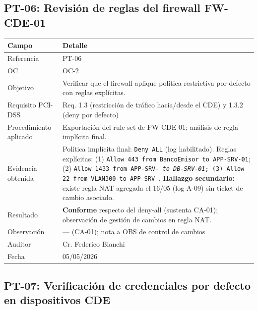 \documentclass[11pt,a4paper]{article}
\begin{document}
\subsection{PT-06: Revisión de reglas del firewall FW-CDE-01}

\begin{tabularx}{\textwidth}{P{5cm}L}
\toprule
\textbf{Campo} & \textbf{Detalle} \\
\midrule
Referencia & PT-06 \\
OC & OC-2 \\
Objetivo & Verificar que el firewall aplique política restrictiva por defecto con reglas explícitas. \\
Requisito PCI-DSS & Req. 1.3 (restricción de tráfico hacia/desde el CDE) y 1.3.2 (deny por defecto) \\
Procedimiento aplicado & Exportación del rule-set de FW-CDE-01; análisis de regla implícita final. \\
Evidencia obtenida & Política implícita final: \texttt{Deny ALL} (log habilitado). Reglas explícitas: (1) \texttt{Allow 443 from BancoEmisor to APP-SRV-01}; (2) \texttt{Allow 1433 from APP-SRV-\textit{ to DB-SRV-01}; (3) \texttt{Allow 22 from VLAN300 to APP-SRV-}}. \textbf{Hallazgo secundario:} existe regla NAT agregada el 16/05 (log A-09) sin ticket de cambio asociado. \\
Resultado & \textbf{Conforme} respecto del deny-all (sustenta CA-01); observación de gestión de cambios en regla NAT. \\
Observación & — (CA-01); nota a OBS de control de cambios \\
Auditor & Cr. Federico Bianchi \\
Fecha & 05/05/2026 \\
\bottomrule
\end{tabularx}

\subsection{PT-07: Verificación de credenciales por defecto en dispositivos CDE}
\end{document}
